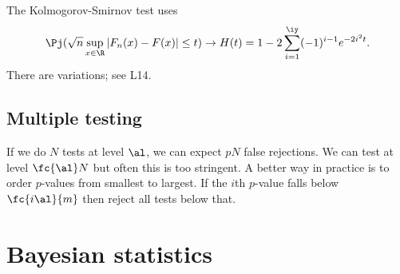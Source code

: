 The Kolmogorov-Smirnov test uses
\[
\Pj(\sqrt n\sup_{x\in \R} |F_n(x)-F(x)|\le t)\to H(t)=1-2\sum_{i=1}^{\iy} (-1)^{i-1} e^{-2i^2t}.
\]
There are variations; see L14.

\subsection{Multiple testing}

If we do $N$ tests at level $\al$, we can expect $pN$ false rejections. We can test at level $\fc{\al}N$ but often this is too stringent. A better way in practice is to order $p$-values from smallest to largest. If the $i$th $p$-value falls below $\fc{i\al}{m}$ then reject all tests below that.

\section{Bayesian statistics}

%
 
%
%
